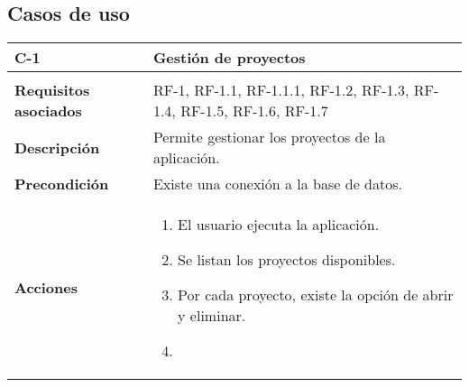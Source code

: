 \subsection{Casos de uso}


\begin{longtable}[H]{@{}ll@{}}
\toprule
\begin{minipage}[b]{0.23\columnwidth}\raggedright\strut
\textbf{C-1}\strut
\end{minipage} & \begin{minipage}[b]{0.71\columnwidth}\raggedright\strut
\textbf{Gestión de proyectos}\strut
\end{minipage}\tabularnewline
\midrule
\endhead
\tabularnewline
\begin{minipage}[t]{0.23\columnwidth}\raggedright\strut
\textbf{Requisitos asociados}\strut
\end{minipage} & \begin{minipage}[t]{0.71\columnwidth}\raggedright\strut
RF-1, RF-1.1, RF-1.1.1, RF-1.2, RF-1.3, RF-1.4, RF-1.5, RF-1.6, RF-1.7\strut
\end{minipage}\tabularnewline
\begin{minipage}[t]{0.23\columnwidth}\raggedright\strut
\textbf{Descripción}\strut
\end{minipage} & \begin{minipage}[t]{0.71\columnwidth}\raggedright\strut
Permite gestionar los proyectos de la aplicación.\strut
\end{minipage}\tabularnewline
\begin{minipage}[t]{0.23\columnwidth}\raggedright\strut
\textbf{Precondición}\strut
\end{minipage} & \begin{minipage}[t]{0.71\columnwidth}\raggedright\strut
Existe una conexión a la base de datos.\strut
\end{minipage}\tabularnewline
\begin{minipage}[t]{0.23\columnwidth}\raggedright\strut
\textbf{Acciones}\strut
\end{minipage} & \begin{minipage}[t]{0.71\columnwidth}\raggedright\strut
\begin{enumerate}
\def\labelenumi{\arabic{enumi}.}
\item
El usuario ejecuta la aplicación.
\item
Se listan los proyectos disponibles.
\item
Por cada proyecto, existe la opción de abrir y eliminar.
\item

\end{enumerate}
\end{minipage}
\end{longtable}

